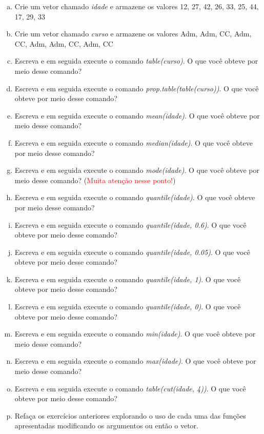 \documentclass[12pt]{article}
\begin{document}
\begin{enumerate}[a)]
    \item Crie um vetor chamado \textit{idade} e armazene os valores 12, 27, 42, 26, 33, 25, 44, 17, 29, 33 
    \item Crie um vetor chamado \textit{curso} e armazene os valores Adm, Adm, CC, Adm, CC, Adm, Adm, CC, Adm, CC
    \item  Escreva e em seguida execute o comando \textit{table(curso)}. O que você obteve por meio desse comando? 
    \item Escreva e em seguida execute o comando \textit{prop.table(table(curso))}. O que você obteve por meio desse comando? 
    \item Escreva e em seguida execute o comando \textit{mean(idade)}. O que você obteve por meio desse comando? 
    \item Escreva e em seguida execute o comando \textit{median(idade)}. O que você obteve por meio desse comando? 
    \item Escreva e em seguida execute o comando \textit{mode(idade)}. O que você obteve por meio desse comando? (\textcolor{red}{Muita atenção nesse ponto!})
    \item Escreva e em seguida execute o comando \textit{quantile(idade)}. O que você obteve por meio desse comando? 
    \item Escreva e em seguida execute o comando \textit{quantile(idade, 0.6)}. O que você obteve por meio desse comando? 
    \item Escreva e em seguida execute o comando \textit{quantile(idade, 0.05)}. O que você obteve por meio desse comando? 
    \item Escreva e em seguida execute o comando \textit{quantile(idade, 1)}. O que você obteve por meio desse comando? 
    \item Escreva e em seguida execute o comando \textit{quantile(idade, 0)}. O que você obteve por meio desse comando?
    \item Escreva e em seguida execute o comando \textit{min(idade)}. O que você obteve por meio desse comando?
    \item Escreva e em seguida execute o comando \textit{max(idade)}. O que você obteve por meio desse comando?
    \item Escreva e em seguida execute o comando \textit{table(cut(idade, 4))}. O que você obteve por meio desse comando?
    \item Refaça os exercícios anteriores explorando o uso de cada uma das funções apresentadas modificando os argumentos ou então o vetor. 
\end{enumerate}
\end{document}
